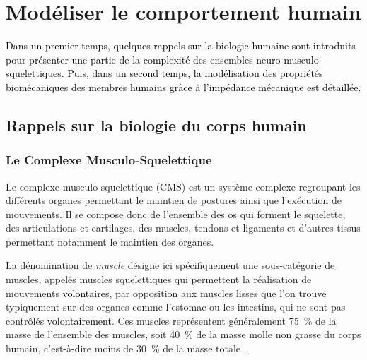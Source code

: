 \section{Modéliser le comportement humain} \label{chap_1_sec_modelling_human}

\textcolor{black}{Dans un premier temps, quelques rappels sur la biologie humaine sont introduits pour présenter une partie de la complexité des ensembles neuro-musculo-squelettiques. Puis, dans un second temps, la modélisation des propriétés biomécaniques des membres humains grâce à l'impédance mécanique est détaillée.}


\subsection{Rappels sur la biologie du corps humain} \label{chap_1_sec_modelling_human_subsec_1}

\subsubsection{Le Complexe Musculo-Squelettique} \label{chap_1_sec_modelling_human_subsec_1_1}

Le complexe musculo-squelettique (CMS) est un système complexe regroupant les différents organes permettant le maintien de postures ainsi que l'exécution de mouvements. Il se compose donc de l'ensemble des os qui forment le squelette, des articulations et cartilages, des muscles, tendons et ligaments et d'autres tissus permettant notamment le maintien des organes.

La dénomination de \emph{muscle} désigne ici spécifiquement une sous-catégorie de muscles, appelés muscles squelettiques qui permettent la réalisation de mouvements \textcolor{black}{volontaires}, par opposition aux muscles lisses que l'on trouve typiquement sur des organes comme l'estomac ou les intestins, qui ne sont pas contrôlés \textcolor{black}{volontairement}. Ces muscles représentent généralement \SI{75}{\percent} de la masse de l'ensemble des muscles, soit \SI{40}{\percent} de la masse molle non grasse du corps humain, c'est-à-dire moins de \SI{30}{\percent} de la masse totale \parencite{buckinx_pitfalls_2018}.

